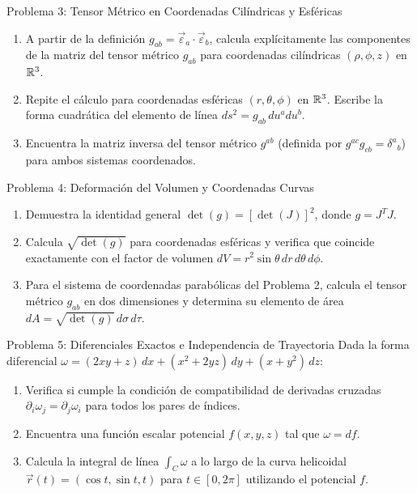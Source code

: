 \documentclass[11pt,letterpaper]{article}
\begin{document}

\begin{infobox}{Problema 3: Tensor Métrico en Coordenadas Cilíndricas y Esféricas}
\begin{enumerate}[label=(\alph*)]
    \item A partir de la definición $g_{ab} = \vec{\varepsilon}_a \cdot \vec{\varepsilon}_b$, calcula explícitamente las componentes de la matriz del tensor métrico $g_{ab}$ para coordenadas cilíndricas $(\rho, \phi, z)$ en $\mathbb{R}^3$.
    \item Repite el cálculo para coordenadas esféricas $(r, \theta, \phi)$ en $\mathbb{R}^3$. Escribe la forma cuadrática del elemento de línea $ds^2 = g_{ab}\,du^a du^b$.
    \item Encuentra la matriz inversa del tensor métrico $g^{ab}$ (definida por $g^{ac} g_{cb} = \delta^a{}_b$) para ambos sistemas coordenados.
\end{enumerate}
\end{infobox}

\begin{infobox}{Problema 4: Deformación del Volumen y Coordenadas Curvas}
\begin{enumerate}[label=(\alph*)]
    \item Demuestra la identidad general $\det(g) = [\det(J)]^2$, donde $g = J^T J$.
    \item Calcula $\sqrt{\det(g)}$ para coordenadas esféricas y verifica que coincide exactamente con el factor de volumen $dV = r^2\sin\theta\,dr\,d\theta\,d\phi$.
    \item Para el sistema de coordenadas parabólicas del Problema 2, calcula el tensor métrico $g_{ab}$ en dos dimensiones y determina su elemento de área $dA = \sqrt{\det(g)}\,d\sigma\,d\tau$.
\end{enumerate}
\end{infobox}


\begin{infobox}{Problema 5: Diferenciales Exactos e Independencia de Trayectoria}
Dada la forma diferencial $\omega = (2xy + z)\,dx + (x^2 + 2yz)\,dy + (x + y^2)\,dz$:
\begin{enumerate}[label=(\alph*)]
    \item Verifica si cumple la condición de compatibilidad de derivadas cruzadas $\partial_i \omega_j = \partial_j \omega_i$ para todos los pares de índices.
    \item Encuentra una función escalar potencial $f(x, y, z)$ tal que $\omega = df$.
    \item Calcula la integral de línea $\int_C \omega$ a lo largo de la curva helicoidal $\vec{r}(t) = (\cos t, \sin t, t)$ para $t \in [0, 2\pi]$ utilizando el potencial $f$.
\end{enumerate}
\end{infobox}
\end{document}
